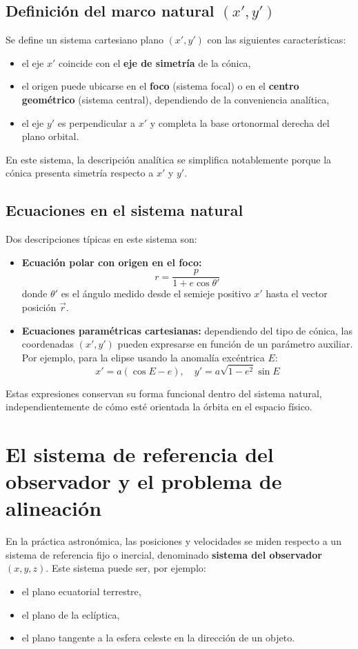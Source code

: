 \subsection{Definición del marco natural \texorpdfstring{$(x',y')$}{(x',y')}}
Se define un sistema cartesiano plano \((x', y')\) con las siguientes características:
\begin{itemize}
    \item el eje \(x'\) coincide con el \textbf{eje de simetría} de la cónica,
    \item el origen puede ubicarse en el \textbf{foco} (sistema focal) o en el \textbf{centro geométrico} (sistema central), dependiendo de la conveniencia analítica,
    \item el eje \(y'\) es perpendicular a \(x'\) y completa la base ortonormal derecha del plano orbital.
\end{itemize}

En este sistema, la descripción analítica se simplifica notablemente porque la cónica presenta simetría respecto a \(x'\) y \(y'\).

\subsection{Ecuaciones en el sistema natural}
Dos descripciones típicas en este sistema son:
\begin{itemize}
    \item \textbf{Ecuación polar con origen en el foco:}
\[
 r = \frac{p}{1 + e\cos\theta'}
\]
    donde \(\theta'\) es el ángulo medido desde el semieje positivo \(x'\) hasta el vector posición \(\vec{r}\).
    \item \textbf{Ecuaciones paramétricas cartesianas:} dependiendo del tipo de cónica, las coordenadas \((x', y')\) pueden expresarse en función de un parámetro auxiliar. Por ejemplo, para la elipse usando la anomalía excéntrica \(E\):
\[
 x' = a(\cos E - e), \quad y' = a\sqrt{1-e^2}\sin E
\]
\end{itemize}

Estas expresiones conservan su forma funcional dentro del sistema natural, independientemente de cómo esté orientada la órbita en el espacio físico.

\section{El sistema de referencia del observador y el problema de alineación}
En la práctica astronómica, las posiciones y velocidades se miden respecto a un sistema de referencia fijo o inercial, denominado \textbf{sistema del observador} \((x,y,z)\). Este sistema puede ser, por ejemplo:
\begin{itemize}
    \item el plano ecuatorial terrestre,
    \item el plano de la eclíptica,
    \item el plano tangente a la esfera celeste en la dirección de un objeto.
\end{itemize}

